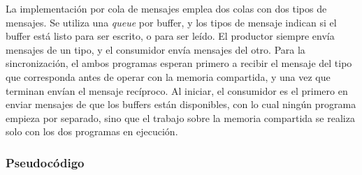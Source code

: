 La implementación por cola de mensajes emplea dos colas con dos tipos de mensajes. Se utiliza una \textit{queue} por buffer, y los tipos de mensaje indican si el buffer está listo para ser escrito, o para ser leído. El productor siempre envía mensajes de un tipo, y el consumidor envía mensajes del otro. Para la sincronización, el ambos programas esperan primero a recibir el mensaje del tipo que corresponda antes de operar con la memoria compartida, y una vez que terminan envían el mensaje recíproco. Al iniciar, el consumidor es el primero en enviar mensajes de que los buffers están disponibles, con lo cual ningún programa empieza por separado, sino que el trabajo sobre la memoria compartida se realiza solo con los dos programas en ejecución.\\

\subsubsection{Pseudocódigo}

